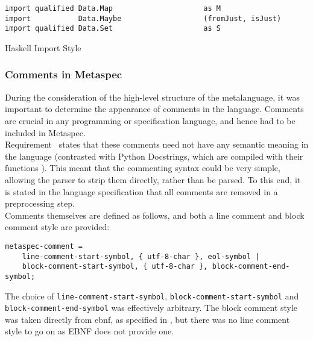 \begin{listing}
\begin{verbatim}
import qualified Data.Map                     as M
import           Data.Maybe                   (fromJust, isJust)
import qualified Data.Set                     as S
\end{verbatim}
\caption{Haskell Import Style}
\label{lst:haskell_import_style}
\end{listing}


\subsubsection{Comments in Metaspec} %
\label{ssub:comments_in_metaspec}
During the consideration of the high-level structure of the metalanguage, it was important to determine the appearance of comments in the language.
Comments are crucial in any programming or specification language, and hence had to be included in Metaspec. \\

Requirement~ states that these comments need not have any semantic meaning in the language (contrasted with Python Docstrings, which are compiled with their functions \citep{python_docstrings}).
This meant that the commenting syntax could be very simple, allowing the parser to strip them directly, rather than be parsed.
To this end, it is stated in the language specification that all comments are removed in a preprocessing step. \\

Comments themselves are defined as follows, and both a line comment and block comment style are provided:
\begin{lstlisting}[caption={Comments in Metaspec}, label={lst:comments_in_metaspec}, firstnumber=149]
metaspec-comment =
    line-comment-start-symbol, { utf-8-char }, eol-symbol |
    block-comment-start-symbol, { utf-8-char }, block-comment-end-symbol;
\end{lstlisting}

The choice of \lstinline{line-comment-start-symbol}, \lstinline{block-comment-start-symbol} and \lstinline{block-comment-end-symbol} was effectively arbitrary.
The block comment style was taken directly from \gls{ebnf}, as specified in \cite{standard1996ebnf}, but there was no line comment style to go on as EBNF does not provide one. \\

